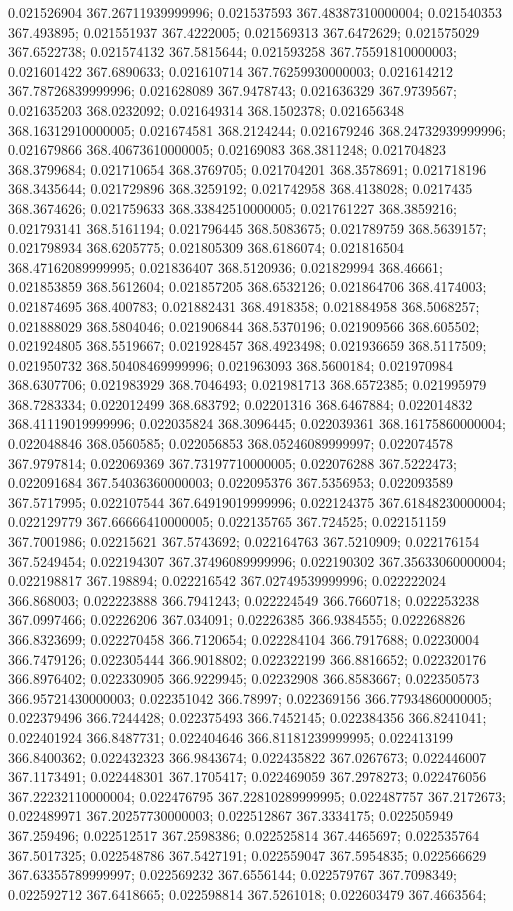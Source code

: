 0.021526904 367.26711939999996; 0.021537593 367.48387310000004; 0.021540353 367.493895; 0.021551937 367.4222005; 0.021569313 367.6472629; 0.021575029 367.6522738; 0.021574132 367.5815644; 0.021593258 367.75591810000003; 0.021601422 367.6890633; 0.021610714 367.76259930000003; 0.021614212 367.78726839999996; 0.021628089 367.9478743; 0.021636329 367.9739567; 0.021635203 368.0232092; 0.021649314 368.1502378; 0.021656348 368.16312910000005; 0.021674581 368.2124244; 0.021679246 368.24732939999996; 0.021679866 368.40673610000005; 0.02169083 368.3811248; 0.021704823 368.3799684; 0.021710654 368.3769705; 0.021704201 368.3578691; 0.021718196 368.3435644; 0.021729896 368.3259192; 0.021742958 368.4138028; 0.0217435 368.3674626; 0.021759633 368.33842510000005; 0.021761227 368.3859216; 0.021793141 368.5161194; 0.021796445 368.5083675; 0.021789759 368.5639157; 0.021798934 368.6205775; 0.021805309 368.6186074; 0.021816504 368.47162089999995; 0.021836407 368.5120936; 0.021829994 368.46661; 0.021853859 368.5612604; 0.021857205 368.6532126; 0.021864706 368.4174003; 0.021874695 368.400783; 0.021882431 368.4918358; 0.021884958 368.5068257; 0.021888029 368.5804046; 0.021906844 368.5370196; 0.021909566 368.605502; 0.021924805 368.5519667; 0.021928457 368.4923498; 0.021936659 368.5117509; 0.021950732 368.50408469999996; 0.021963093 368.5600184; 0.021970984 368.6307706; 0.021983929 368.7046493; 0.021981713 368.6572385; 0.021995979 368.7283334; 0.022012499 368.683792; 0.02201316 368.6467884; 0.022014832 368.41119019999996; 0.022035824 368.3096445; 0.022039361 368.16175860000004; 0.022048846 368.0560585; 0.022056853 368.05246089999997; 0.022074578 367.9797814; 0.022069369 367.73197710000005; 0.022076288 367.5222473; 0.022091684 367.54036360000003; 0.022095376 367.5356953; 0.022093589 367.5717995; 0.022107544 367.64919019999996; 0.022124375 367.61848230000004; 0.022129779 367.66666410000005; 0.022135765 367.724525; 0.022151159 367.7001986; 0.02215621 367.5743692; 0.022164763 367.5210909; 0.022176154 367.5249454; 0.022194307 367.37496089999996; 0.022190302 367.35633060000004; 0.022198817 367.198894; 0.022216542 367.02749539999996; 0.022222024 366.868003; 0.022223888 366.7941243; 0.022224549 366.7660718; 0.022253238 367.0997466; 0.02226206 367.034091; 0.02226385 366.9384555; 0.022268826 366.8323699; 0.022270458 366.7120654; 0.022284104 366.7917688; 0.02230004 366.7479126; 0.022305444 366.9018802; 0.022322199 366.8816652; 0.022320176 366.8976402; 0.022330905 366.9229945; 0.02232908 366.8583667; 0.022350573 366.95721430000003; 0.022351042 366.78997; 0.022369156 366.77934860000005; 0.022379496 366.7244428; 0.022375493 366.7452145; 0.022384356 366.8241041; 0.022401924 366.8487731; 0.022404646 366.81181239999995; 0.022413199 366.8400362; 0.022432323 366.9843674; 0.022435822 367.0267673; 0.022446007 367.1173491; 0.022448301 367.1705417; 0.022469059 367.2978273; 0.022476056 367.22232110000004; 0.022476795 367.22810289999995; 0.022487757 367.2172673; 0.022489971 367.20257730000003; 0.022512867 367.3334175; 0.022505949 367.259496; 0.022512517 367.2598386; 0.022525814 367.4465697; 0.022535764 367.5017325; 0.022548786 367.5427191; 0.022559047 367.5954835; 0.022566629 367.63355789999997; 0.022569232 367.6556144; 0.022579767 367.7098349; 0.022592712 367.6418665; 0.022598814 367.5261018; 0.022603479 367.4663564; 